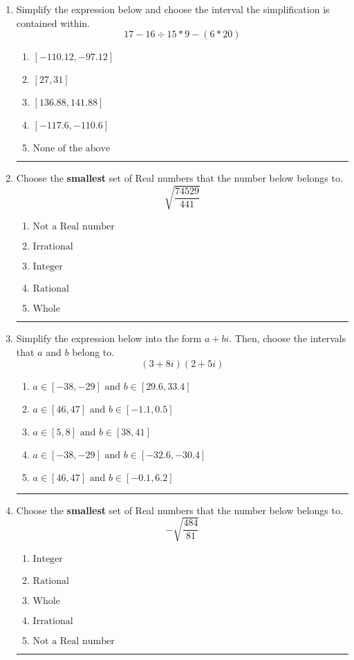 \documentclass[14pt]{extbook}
\newcommand{\litem}[1]{\item#1\hspace*{-1cm}\rule{\textwidth}{0.4pt}}
\begin{document}
\begin{enumerate}
\litem{
Simplify the expression below and choose the interval the simplification is contained within.\[ 17 - 16 \div 15 * 9 - (6 * 20) \]\begin{enumerate}[label=\Alph*.]
\item \( [-110.12, -97.12] \)
\item \( [27, 31] \)
\item \( [136.88, 141.88] \)
\item \( [-117.6, -110.6] \)
\item \( \text{None of the above} \)

\end{enumerate} }
\litem{
Choose the \textbf{smallest} set of Real numbers that the number below belongs to.\[ \sqrt{\frac{74529}{441}} \]\begin{enumerate}[label=\Alph*.]
\item \( \text{Not a Real number} \)
\item \( \text{Irrational} \)
\item \( \text{Integer} \)
\item \( \text{Rational} \)
\item \( \text{Whole} \)

\end{enumerate} }
\litem{
Simplify the expression below into the form $a+bi$. Then, choose the intervals that $a$ and $b$ belong to.\[ (3 + 8 i)(2 + 5 i) \]\begin{enumerate}[label=\Alph*.]
\item \( a \in [-38, -29] \text{ and } b \in [29.6, 33.4] \)
\item \( a \in [46, 47] \text{ and } b \in [-1.1, 0.5] \)
\item \( a \in [5, 8] \text{ and } b \in [38, 41] \)
\item \( a \in [-38, -29] \text{ and } b \in [-32.6, -30.4] \)
\item \( a \in [46, 47] \text{ and } b \in [-0.1, 6.2] \)

\end{enumerate} }
\litem{
Choose the \textbf{smallest} set of Real numbers that the number below belongs to.\[ -\sqrt{\frac{484}{81}} \]\begin{enumerate}[label=\Alph*.]
\item \( \text{Integer} \)
\item \( \text{Rational} \)
\item \( \text{Whole} \)
\item \( \text{Irrational} \)
\item \( \text{Not a Real number} \)


\end{enumerate}}
\end{enumerate}
\end{document}
